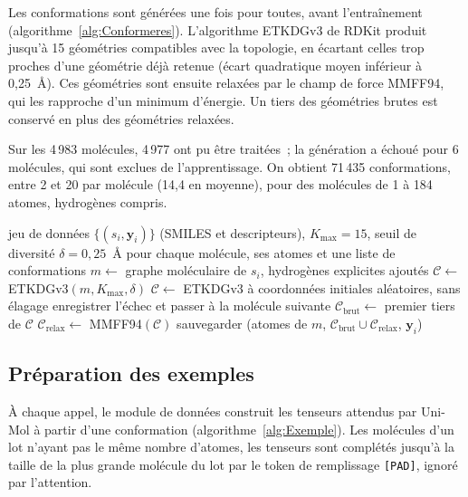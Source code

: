 Les conformations sont générées une fois pour toutes, avant l'entraînement (algorithme~\ref{alg:Conformeres}).
L'algorithme ETKDGv3 de RDKit produit jusqu'à 15 géométries compatibles avec la topologie, en écartant celles trop proches d'une géométrie déjà retenue (écart quadratique moyen inférieur à 0,25~\AA).
Ces géométries sont ensuite relaxées par le champ de force MMFF94, qui les rapproche d'un minimum d'énergie.
Un tiers des géométries brutes est conservé en plus des géométries relaxées.

Sur les 4\,983 molécules, 4\,977 ont pu être traitées~; la génération a échoué pour 6 molécules, qui sont exclues de l'apprentissage.
On obtient 71\,435 conformations, entre 2 et 20 par molécule (14,4 en moyenne), pour des molécules de 1 à 184 atomes, hydrogènes compris.

\begin{algorithm}
   \caption{Génération hors ligne des conformations}
   \label{alg:Conformeres}
   \begin{algorithmic}[1]
      \REQUIRE jeu de données $\{(s_i, \mathbf{y}_i)\}$ (SMILES et descripteurs), $K_{\max} = 15$, seuil de diversité $\delta = 0{,}25$~\AA
      \ENSURE pour chaque molécule, ses atomes et une liste de conformations
         \STATE $m \leftarrow$ graphe moléculaire de $s_i$, hydrogènes explicites ajoutés
         \STATE $\mathcal{C} \leftarrow$ ETKDGv3$(m, K_{\max}, \delta)$ 
            \STATE $\mathcal{C} \leftarrow$ ETKDGv3 à coordonnées initiales aléatoires, sans élagage
         \ENDIF
            \STATE enregistrer l'échec et passer à la molécule suivante
         \ENDIF
         \STATE $\mathcal{C}_{\mathrm{brut}} \leftarrow$ premier tiers de $\mathcal{C}$
         \STATE $\mathcal{C}_{\mathrm{relax}} \leftarrow$ MMFF94$(\mathcal{C})$ 
         \STATE sauvegarder (atomes de $m$, $\mathcal{C}_{\mathrm{brut}} \cup \mathcal{C}_{\mathrm{relax}}$, $\mathbf{y}_i$)
      \ENDFOR
   \end{algorithmic}
\end{algorithm}

\subsection{Préparation des exemples}

À chaque appel, le module de données construit les tenseurs attendus par Uni-Mol à partir d'une conformation (algorithme~\ref{alg:Exemple}).
Les molécules d'un lot n'ayant pas le même nombre d'atomes, les tenseurs sont complétés jusqu'à la taille de la plus grande molécule du lot par le token de remplissage \texttt{[PAD]}, ignoré par l'attention.

